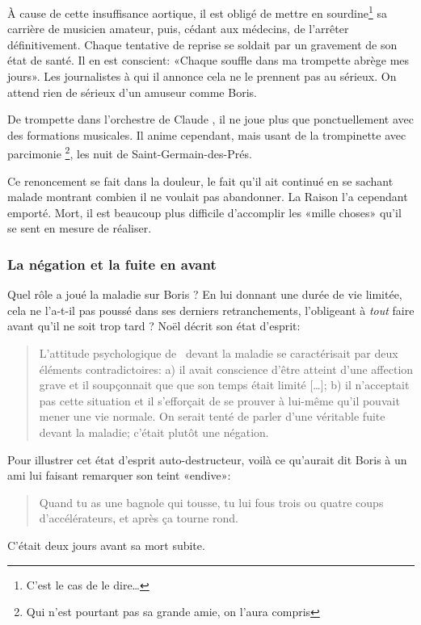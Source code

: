À cause de cette insuffisance aortique, il est obligé de mettre en sourdine\footnote{C'est le cas
de le dire\ldots} sa carrière de musicien amateur, puis, cédant aux médecins, de l'arrêter
définitivement. Chaque tentative de reprise se soldait par un gravement de son état de santé.
Il en est conscient: «Chaque souffle dans ma trompette abrège mes jours». Les journalistes à
qui il annonce cela ne le prennent pas au sérieux. On attend rien de sérieux d'un
amuseur comme Boris.

De trompette dans l'orchestre de Claude , il ne joue plus que ponctuellement avec des
formations musicales. Il anime cependant, mais usant de la trompinette avec parcimonie
\footnote{Qui n'est pourtant pas sa grande amie, on l'aura compris}, les nuit de Saint-Germain-des-Prés.

Ce renoncement se fait dans la douleur, le fait qu'il ait continué en se sachant malade montrant
combien il ne voulait pas abandonner. La Raison l'a cependant emporté. Mort, il est beaucoup
plus difficile d'accomplir les «mille choses» qu'il se sent en mesure de réaliser.

\subsubsection{La négation et la fuite en avant}

Quel rôle a joué la maladie sur Boris ? En lui donnant une durée de vie limitée, cela
ne l'a-t-il pas poussé dans ses derniers retranchements, l'obligeant à \emph{tout} faire
avant qu'il ne soit trop tard ? Noël  décrit son état d'esprit:
{\small
\begin{quotation}
L'attitude psychologique de \BV\ devant la maladie se caractérisait par deux éléments
contradictoires: a) il avait conscience d'être atteint d'une affection grave et il soupçonnait que
que son temps était limité [\ldots]; b) il n'acceptait pas cette situation et il s'efforçait de se
prouver à lui-même qu'il pouvait mener une vie normale. On serait tenté de parler d'une
véritable fuite devant la maladie; c'était plutôt une négation.
\end{quotation}
}
Pour illustrer cet état d'esprit auto-destructeur, voilà ce qu'aurait dit
Boris à un ami lui faisant remarquer son teint «endive»:
{\small
\begin{quotation}
Quand tu as une bagnole qui tousse, tu lui fous trois ou quatre coups d'accélérateurs,
et après ça tourne rond.
\end{quotation}
}
C'était deux jours avant sa mort subite.


